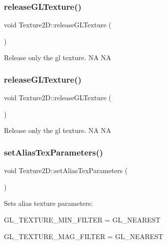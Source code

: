\subsubsection{\texorpdfstring{release\+G\+L\+Texture()}{releaseGLTexture()}\hspace{0.1cm}{\footnotesize\ttfamily [1/2]}}
{\footnotesize\ttfamily void Texture2\+D\+::release\+G\+L\+Texture (\begin{DoxyParamCaption}{ }\end{DoxyParamCaption})}

Release only the gl texture.  NA  NA \mbox{\label{classTexture2D_ae9edf32b4f3dc4841e09a2b1835fc08c}} 
\subsubsection{\texorpdfstring{release\+G\+L\+Texture()}{releaseGLTexture()}\hspace{0.1cm}{\footnotesize\ttfamily [2/2]}}
{\footnotesize\ttfamily void Texture2\+D\+::release\+G\+L\+Texture (\begin{DoxyParamCaption}{ }\end{DoxyParamCaption})}

Release only the gl texture.  NA  NA \mbox{\label{classTexture2D_affbb5fcc6fee13cfab17dada97d59904}} 
\subsubsection{\texorpdfstring{set\+Alias\+Tex\+Parameters()}{setAliasTexParameters()}\hspace{0.1cm}{\footnotesize\ttfamily [1/2]}}
{\footnotesize\ttfamily void Texture2\+D\+::set\+Alias\+Tex\+Parameters (\begin{DoxyParamCaption}{ }\end{DoxyParamCaption})}

Sets alias texture parameters\+:
\begin{DoxyItemize}
\item G\+L\+\_\+\+T\+E\+X\+T\+U\+R\+E\+\_\+\+M\+I\+N\+\_\+\+F\+I\+L\+T\+ER = G\+L\+\_\+\+N\+E\+A\+R\+E\+ST
\item G\+L\+\_\+\+T\+E\+X\+T\+U\+R\+E\+\_\+\+M\+A\+G\+\_\+\+F\+I\+L\+T\+ER = G\+L\+\_\+\+N\+E\+A\+R\+E\+ST
\end{DoxyItemize}

